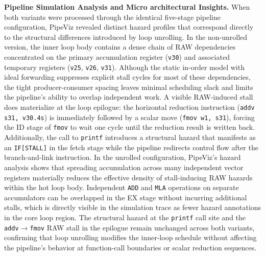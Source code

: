 \textbf{Pipeline Simulation Analysis and Micro architectural Insights.} When both variants were processed through the identical five-stage pipeline configuration, PipeViz revealed distinct hazard profiles that correspond directly to the structural differences introduced by loop unrolling. In the non-unrolled version, the inner loop body contains a dense chain of RAW dependencies concentrated on the primary accumulation register (\texttt{v30}) and associated temporary registers (\texttt{v25}, \texttt{v26}, \texttt{v31}). Although the static in-order model with ideal forwarding suppresses explicit stall cycles for most of these dependencies, the tight producer-consumer spacing leaves minimal scheduling slack and limits the pipeline's ability to overlap independent work. A visible RAW-induced stall does materialize at the loop epilogue: the horizontal reduction instruction (\texttt{addv s31, v30.4s}) is immediately followed by a scalar move (\texttt{fmov w1, s31}), forcing the ID stage of \texttt{fmov} to wait one cycle until the reduction result is written back. Additionally, the call to \texttt{printf} introduces a structural hazard that manifests as an \texttt{IF[STALL]} in the fetch stage while the pipeline redirects control flow after the branch-and-link instruction. In the unrolled configuration, PipeViz's hazard analysis shows that spreading accumulation across many independent vector registers materially reduces the effective density of stall-inducing RAW hazards within the hot loop body. Independent \texttt{ADD} and \texttt{MLA} operations on separate accumulators can be overlapped in the EX stage without incurring additional stalls, which is directly visible in the simulation trace as fewer hazard annotations in the core loop region. The structural hazard at the \texttt{printf} call site and the \texttt{addv}$\rightarrow$\texttt{fmov} RAW stall in the epilogue remain unchanged across both variants, confirming that loop unrolling modifies the inner-loop schedule without affecting the pipeline's behavior at function-call boundaries or scalar reduction sequences.

